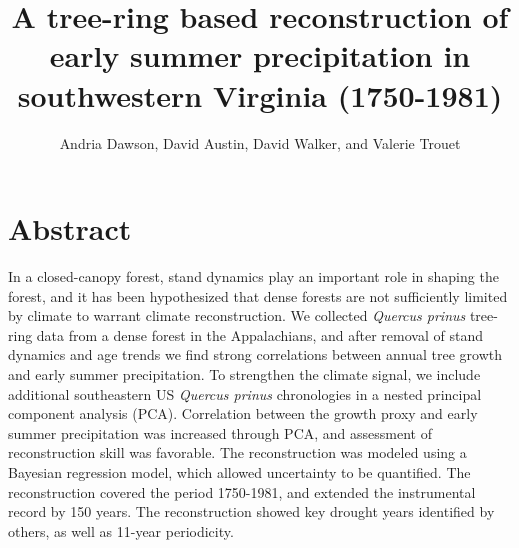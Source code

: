 \documentclass[11pt]{article}
\begin{document}
\title{A tree-ring based reconstruction of early summer precipitation in southwestern Virginia {(1750-1981)}}
\author{Andria Dawson, David Austin, David Walker, and Valerie Trouet}

\maketitle

\section*{Abstract}

In a closed-canopy forest, stand dynamics play an important role in shaping the forest, and it has been hypothesized that dense forests are not sufficiently limited by climate to warrant climate reconstruction. We collected \textit{Quercus prinus} tree-ring data from a dense forest in the Appalachians, and after removal of stand dynamics and age trends we find strong correlations between annual tree growth and early summer precipitation. To strengthen the climate signal, we include additional southeastern US \textit{Quercus prinus} chronologies in a nested principal component analysis (PCA). Correlation between the growth proxy and early summer precipitation was increased through PCA, and assessment of reconstruction skill was favorable. The reconstruction was modeled using a Bayesian regression model, which allowed uncertainty to be quantified. The reconstruction covered the period 1750-1981, and extended the instrumental record by 150 years. The reconstruction showed key drought years identified by others, as well as 11-year periodicity.





\clearpage
\newpage


\clearpage
\newpage



\newpage
\clearpage
%


\end{document}
